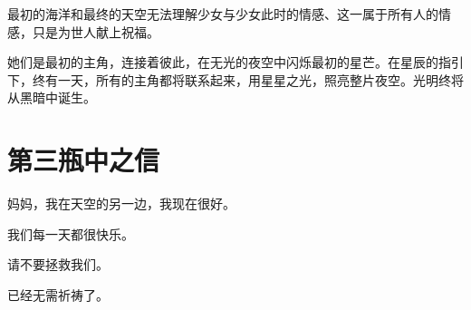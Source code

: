 最初的海洋和最终的天空无法理解少女与少女此时的情感、这一属于所有人的情感，只是为世人献上祝福。

她们是最初的主角，连接着彼此，在无光的夜空中闪烁最初的星芒。在星辰的指引下，终有一天，所有的主角都将联系起来，用星星之光，照亮整片夜空。光明终将从黑暗中诞生。

%
\chapter*{第三瓶中之信}

\begingroup\pencil%
妈妈，我在天空的另一边，我现在很好。

\halfspace 我们每一天都很快乐。

\halfspace 请不要拯救我们。

\halfspace 已经无需祈祷了。

\halfline\hfill%
\endgroup\restoregeometry
